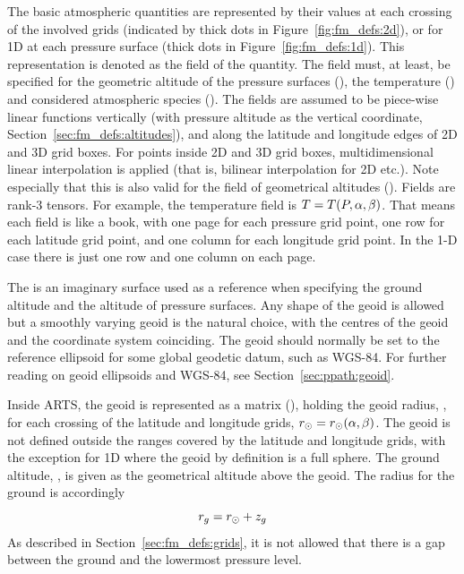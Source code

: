 The basic atmospheric quantities are represented by their values at
each crossing of the involved grids (indicated by thick dots in
Figure~\ref{fig:fm_defs:2d}), or for 1D at each pressure surface
(thick dots in Figure~\ref{fig:fm_defs:1d}). This representation is
denoted as the field of the quantity. The
field must, at least, be specified for the geometric altitude of the
pressure surfaces (), the temperature
() and considered atmospheric species
().  The fields are assumed to be piece-wise
linear functions vertically (with pressure altitude as the vertical
coordinate, Section~\ref{sec:fm_defs:altitudes}), and along the
latitude and longitude edges of 2D and 3D grid boxes. For points
inside 2D and 3D grid boxes, multidimensional linear interpolation is
applied (that is, bilinear interpolation for 2D etc.). Note especially
that this is also valid for the field of geometrical altitudes
(). Fields are rank-3 tensors. For example, the
temperature field is $T=T(P,\alpha,\beta)$. That means each field is
like a book, with one page for each pressure grid point, one row for
each latitude grid point, and one column for each longitude grid
point. In the 1-D case there is just one row and one column on each
page.



\label{sec:fm_defs:geoid}

The  is an imaginary surface used as a
reference when specifying the ground altitude and the altitude
of pressure surfaces. Any shape of the geoid is allowed but a smoothly
varying geoid is the natural choice, with the centres of the geoid and
the coordinate system coinciding. The geoid should normally be set to
the reference ellipsoid for some global geodetic datum, such as
WGS-84. For further reading on geoid ellipsoids and WGS-84, see
Section~\ref{sec:ppath:geoid}.

Inside ARTS, the geoid is represented as a matrix
(), holding the geoid radius, \aRds{\odot}, for
each crossing of the latitude and longitude grids,
$r_{\odot}=r_{\odot}(\alpha,\beta)$. The geoid is not defined
outside the ranges covered by the latitude and longitude grids, with
the exception for 1D where the geoid by definition is a full sphere.
The ground altitude, , is given as the geometrical altitude
above the geoid. The radius for the ground is accordingly
\begin{equation}
  r_{g} = r_{\odot} + z_{g}
 \label{eq:fm_defs:zground}
\end{equation}
As described in
Section~\ref{sec:fm_defs:grids}, it is not allowed that there is a gap
between the ground and the lowermost pressure level.

